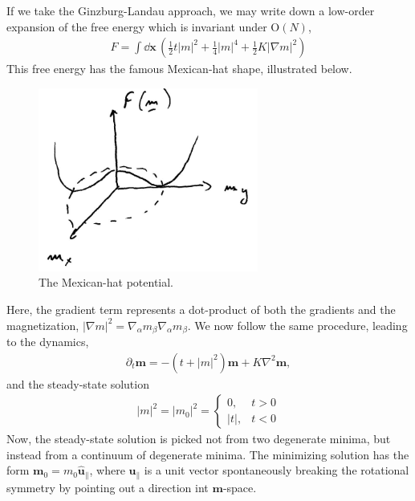If we take the Ginzburg-Landau approach, we may write down a low-order expansion of the free energy which is invariant under $ \mathrm{O}(N)$, 
%
\begin{align}
    F = \int \dd \bm x \, 
    \left(
        \frac{1}{2} t |m|^2 + \frac{1}{4} |m|^4 + \frac{1}{2} K |\nabla m|^2
    \right)
\end{align}
%
This free energy has the famous Mexican-hat shape, illustrated below.

\begin{figure}[!htb]
    \centering
    \includegraphics[width=.4\textwidth]{chapters/Figures/introduction/mexican.png}
    \caption{The Mexican-hat potential.}
    \label{fig: mexican}
\end{figure}

Here, the gradient term represents a dot-product of both the gradients and the magnetization, $|\nabla m|^2 = \nabla_\alpha m_\beta \nabla_\alpha m_\beta$.
We now follow the same procedure, leading to the dynamics,
%
\begin{align}
    \partial_t \bm m = - (t + |m|^2) \bm m + K \nabla^2 \bm m,
\end{align}
%
and the steady-state solution
%
\begin{align}
    |m|^2 = 
    |m_0|^2 
    =
    \begin{cases}
        0, & t > 0 \\
        |t|, & t < 0 
    \end{cases}
\end{align}
%
Now, the steady-state solution is picked not from two degenerate minima, but instead from a continuum of degenerate minima.
The minimizing solution has the form $\bm m_0 = m_0 \hat {\bm u}_\parallel$, where $\hat {\bm u}_\parallel$ is a unit vector spontaneously breaking the rotational symmetry by pointing out a direction int $\bm m$-space.

